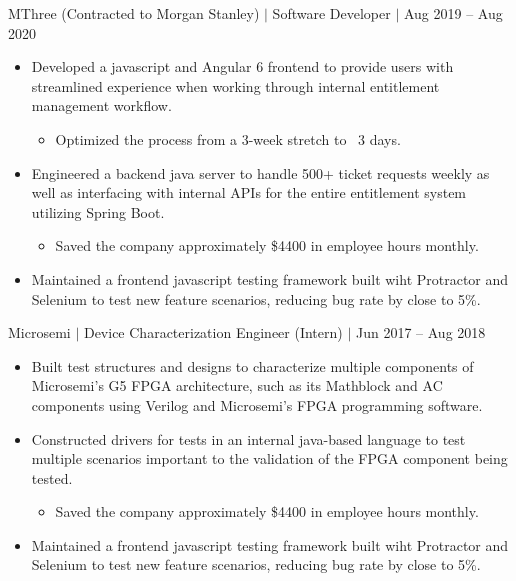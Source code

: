 \documentclass[12pt]{article}
\newcommand{\textDate}[3]{\noindent#1 $|$ #2 $|$ {\color{textGray} #3}}
\begin{document}
    \textDate{MThree (Contracted to Morgan Stanley)}{Software Developer}{Aug 2019 -- Aug 2020}
    \begin{small}
        \begin{itemize}
            \itemsep0em 
            \item {\color{textGray} Developed a javascript and Angular 6 frontend to provide users with streamlined experience when working through internal entitlement management workflow.}
                \begin{itemize}[label=$\circ$,topsep=-5px,partopsep=0px]
                    \itemsep0em 
                    \item {\color{textGray} Optimized the process from a 3-week stretch to ~3 days.}
                \end{itemize}
            \item {\color{textGray} Engineered a backend java server to handle 500+ ticket requests weekly as well as interfacing with internal APIs for the entire entitlement system utilizing Spring Boot.}
                \begin{itemize}[label=$\circ$,topsep=-5px,partopsep=0px]
                    \itemsep0em 
                    \item {\color{textGray} Saved the company approximately \$4400 in employee hours monthly.}
                \end{itemize}
            \item {\color{textGray} Maintained a frontend javascript testing framework built wiht Protractor and Selenium to test new feature scenarios, reducing bug rate by close to 5\%.}
        \end{itemize}
    \end{small}

    \textDate{Microsemi}{Device Characterization Engineer (Intern)}{Jun 2017 -- Aug 2018}
    \begin{small}
        \begin{itemize}
            \itemsep0em 
            \item {\color{textGray} Built test structures and designs to characterize multiple components of Microsemi's G5 FPGA architecture, such as its Mathblock and AC components using Verilog and Microsemi's FPGA programming software.}
            \item {\color{textGray} Constructed drivers for tests in an internal java-based language to test multiple scenarios important to the validation of the FPGA component being tested.}
                \begin{itemize}[label=$\circ$,topsep=-5px,partopsep=0px]
                    \itemsep0em 
                    \item {\color{textGray} Saved the company approximately \$4400 in employee hours monthly.}
                \end{itemize}
            \item {\color{textGray} Maintained a frontend javascript testing framework built wiht Protractor and Selenium to test new feature scenarios, reducing bug rate by close to 5\%.}
        \end{itemize}
    \end{small}
\end{document}
